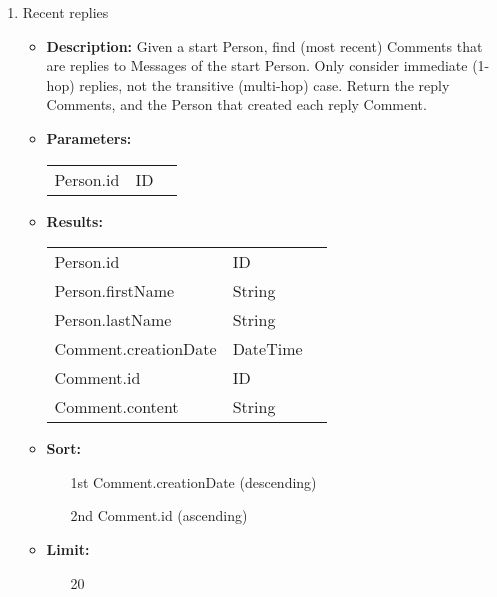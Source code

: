 {\begin{enumerate}
    \item Recent replies
        \begin{itemize}
            \item \textbf{Description:}
                Given a start Person, find (most recent) Comments that are replies
                to Messages of the start Person. Only consider immediate
                (1-hop) replies, not the transitive (multi-hop) case.  Return the
                reply Comments, and the Person that created each reply
                Comment.  
            \item \textbf{Parameters:} \\
                \begin{tabular}{lll}
                    Person.id 	 						& ID & \parbox[t]{20cm}{\par \strut} \\
                \end{tabular}		
            \item \textbf{Results:} \\
                \begin{tabular}{lll}
                    Person.id 	 				& ID & \parbox[t]{20cm}{\par \strut} \\
                    Person.firstName 	 		& String & \parbox[t]{20cm}{\par \strut} \\
                    Person.lastName 	 		& String & \parbox[t]{20cm}{\par \strut} \\
                    Comment.creationDate 	 	& DateTime & \parbox[t]{20cm}{\par \strut} \\
                    Comment.id 	 				& ID & \parbox[t]{20cm}{\par \strut} \\
                    Comment.content 	 		& String & \parbox[t]{20cm}{\par \strut} \\
                \end{tabular}		
             \item \textbf{Sort:}
                  \begin{itemize}
                    \item[1st] Comment.creationDate (descending)
                    \item[2nd] Comment.id (ascending)
                  \end{itemize}
              \item \textbf{Limit:}
                  \begin{itemize}
                    \item[] 20
                  \end{itemize}
        \end{itemize}


\end{enumerate}}
